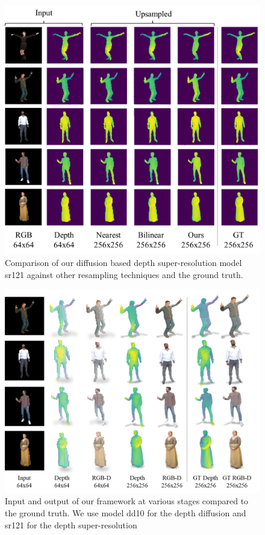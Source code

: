 \begin{figure}[t]
  \centering
  \includegraphics[width=0.99\linewidth]{illustrations/superres_method_comparison.png}
  \caption{Comparison of our diffusion based depth super-resolution model sr121 against other resampling techniques and the ground truth.}
  \label{fig:superres_method_comparison}
\end{figure}

\begin{figure}[t]
  \centering
  \includegraphics[width=0.99\linewidth]{illustrations/superres_pc.png}
  \caption{Input and output of our \modelname{} framework at various stages compared to the ground truth. We use model dd10 for the depth diffusion and sr121 for the depth super-resolution}
  \label{fig:rgb_d_fusion_pipeline_output}
\end{figure}

